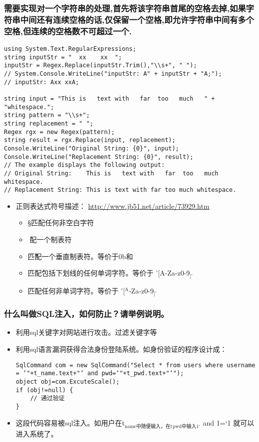 \documentclass[9pt, b5paper]{article}
\begin{document}
\subsubsection{需要实现对一个字符串的处理,首先将该字符串首尾的空格去掉,如果字符串中间还有连续空格的话,仅保留一个空格,即允许字符串中间有多个空格,但连续的空格数不可超过一个.}
\label{sec-1-1-63}
\begin{verbatim}
using System.Text.RegularExpressions;
string inputStr = "  xx    xx  ";
inputStr = Regex.Replace(inputStr.Trim(),"\\s+", " ");
// System.Console.WriteLine("inputStr: A" + inputStr + "A;");
// inputStr: Axx xxA;

string input = "This is   text with   far  too   much   " + "whitespace.";
string pattern = "\\s+";
string replacement = " ";
Regex rgx = new Regex(pattern);
string result = rgx.Replace(input, replacement);
Console.WriteLine("Original String: {0}", input);
Console.WriteLine("Replacement String: {0}", result);                             
// The example displays the following output:
// Original String:    This is   text with   far  too   much   whitespace.
// Replacement String: This is text with far too much whitespace.
\end{verbatim}
\begin{itemize}
\item 正则表达式符号描述： \url{http://www.jb51.net/article/73929.htm}
\begin{itemize}
\item \S 匹配任何非空白字符
\item \t 匹配一个制表符
\item \v 匹配一个垂直制表符。等价于\x0b和\cK
\item \w 匹配包括下划线的任何单词字符。等价于 '[A-Za-z0-9$_{\text{]'}}$
\item \W 匹配任何非单词字符。等价于 '[$^{\text{A}}$-Za-z0-9$_{\text{]'}}$
\end{itemize}
\end{itemize}
\subsubsection{什么叫做SQL注入，如何防止？请举例说明。}
\label{sec-1-1-64}
\begin{itemize}
\item 利用sql关键字对网站进行攻击。过滤关键字等
\item 利用sql语言漏洞获得合法身份登陆系统。如身份验证的程序设计成：

\begin{verbatim}
SqlCommand com = new SqlCommand("Select * from users where username = ‘"+t_name.text+"‘ and pwd=‘"+t_pwd.text+"‘");
object obj=com.ExcuteScale();
if (obj!=null) {
    // 通过验证
}
\end{verbatim}
\item 这段代码容易被sql注入。如用户在t$_{\text{name中随便输入，在t}}$$_{\text{pwd中输入1‘}}$ and 1=‘1 就可以进入系统了。
\end{itemize}
\end{document}
